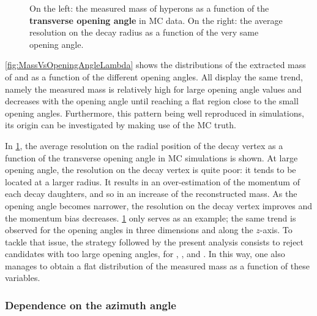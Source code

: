 \begin{figure}[h]
\hspace*{-2.cm}
\caption{On the left: the measured mass of \rmLambda hyperons as a function of the \textbf{transverse opening angle} in MC data. On the right: the average resolution on the decay radius as a function of the very same opening angle.}
	\label{fig:MassVsOpeningAngle}
\end{figure}

\Fig\ref{fig:MassVsOpeningAngleLambda} shows the distributions of the extracted mass of \rmLambda and \rmAlambda as a function of the different opening angles. All display the same trend, namely the measured mass is relatively high for large opening angle values and decreases with the opening angle until reaching a flat region close to the small opening angles. Furthermore, this pattern being well reproduced in simulations, its origin can be investigated by making use of the MC truth. 

In \fig\ref{fig:MassVsOpeningAngle}, the average resolution on the radial position of the decay vertex as a function of the transverse opening angle in MC simulations is shown. At large opening angle, the resolution on the decay vertex is quite poor: it tends to be located at a larger radius. It results in an over-estimation of the momentum of each decay daughters, and so in an increase of the reconstructed mass. As the opening angle becomes narrower, the resolution on the decay vertex improves and the momentum bias decreases. \Fig\ref{fig:MassVsOpeningAngle} only serves as an example; the same trend is observed for the opening angles in three dimensions and along the $z$-axis. To tackle that issue, the strategy followed by the present analysis consists to reject candidates with too large opening angles, for \rmKzeroS, \rmLambdaPM, \rmXiPM and \rmOmegaPM. In this way, one also manages to obtain a flat distribution of the measured mass as a function of these variables.\\

\subsubsection{Dependence on the azimuth angle}
\label{subsubsec:DependenceAzimuthalAngle}

